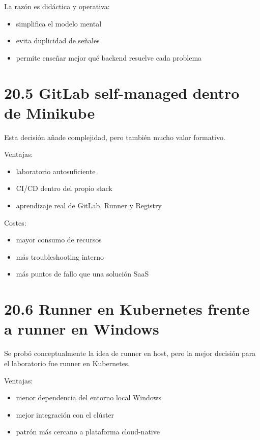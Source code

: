 \documentclass[
a4paper,
12pt]{report}
\providecommand{\tightlist}{%
  \setlength{\itemsep}{0pt}\setlength{\parskip}{0pt}}
\begin{document}
La razón es didáctica y operativa:

\begin{itemize}
\tightlist
\item
  simplifica el modelo mental
\item
  evita duplicidad de señales
\item
  permite enseñar mejor qué backend resuelve cada problema
\end{itemize}

\section{20.5 GitLab self-managed dentro de
Minikube}\label{gitlab-self-managed-dentro-de-minikube}

Esta decisión añade complejidad, pero también mucho valor formativo.

Ventajas:

\begin{itemize}
\tightlist
\item
  laboratorio autosuficiente
\item
  CI/CD dentro del propio stack
\item
  aprendizaje real de GitLab, Runner y Registry
\end{itemize}

Costes:

\begin{itemize}
\tightlist
\item
  mayor consumo de recursos
\item
  más troubleshooting interno
\item
  más puntos de fallo que una solución SaaS
\end{itemize}

\section{20.6 Runner en Kubernetes frente a runner en
Windows}\label{runner-en-kubernetes-frente-a-runner-en-windows}

Se probó conceptualmente la idea de runner en host, pero la mejor
decisión para el laboratorio fue runner en Kubernetes.

Ventajas:

\begin{itemize}
\tightlist
\item
  menor dependencia del entorno local Windows
\item
  mejor integración con el clúster
\item
  patrón más cercano a plataforma cloud-native
\end{itemize}
\end{document}
